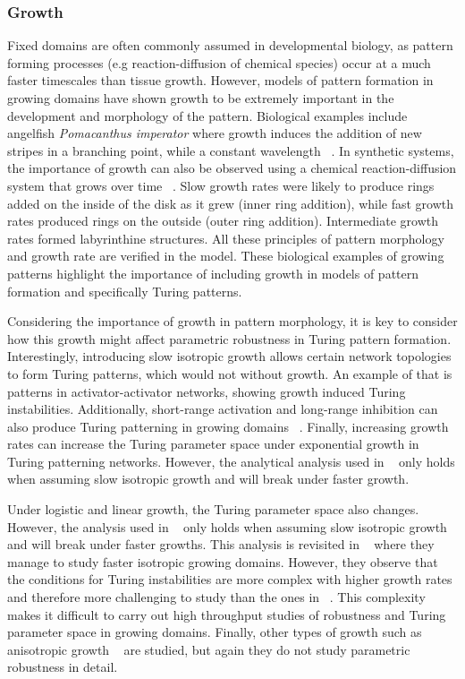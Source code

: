  \subsubsection{Growth}
Fixed domains are often commonly assumed in developmental biology, as pattern forming processes (e.g reaction-diffusion of chemical species) occur at a much faster timescales than tissue growth. %
However, models of pattern formation in growing domains have shown growth to be extremely important in the development and morphology of the pattern.
Biological examples include angelﬁsh \textit{Pomacanthus imperator} where growth induces the addition of new stripes in a branching point, while a constant wavelength ~\parencite{Kondo1995}.
In synthetic systems, the importance of growth can also be observed using a chemical reaction-diffusion system that grows over time ~\parencite{Konow2019}.
Slow growth rates were likely to produce rings added on the inside of the disk as it grew (inner ring addition), while fast growth rates produced rings on the outside (outer ring addition).
Intermediate growth rates formed labyrinthine structures.
All these principles of pattern morphology and growth rate are verified in the model.
These biological examples of growing patterns highlight the importance of including growth in models of pattern formation and specifically Turing patterns.

Considering the importance of growth in pattern morphology, it is key to consider how this growth might affect parametric robustness in Turing pattern formation.
Interestingly, introducing slow isotropic growth allows certain network topologies to form Turing patterns, which would not without growth.
An example of that is patterns in activator-activator networks, showing growth induced Turing instabilities.
Additionally, short-range activation and long-range inhibition can also produce Turing patterning in growing domains ~\cite{gaffney2010}.
Finally, increasing growth rates can increase the Turing parameter space under exponential growth in Turing patterning networks.
However, the analytical analysis used in ~\cite{gaffney2010} only holds when assuming slow isotropic growth and will break under faster growth.

Under logistic and linear growth, the Turing parameter space also changes.
However, the analysis used in ~\cite{gaffney2010} only holds when assuming slow isotropic growth and will break under faster growths.
This analysis is revisited in ~\cite{Klika2017} where they manage to study faster isotropic growing domains.
However, they observe that the conditions for Turing instabilities are more complex with higher growth rates and therefore more challenging to study than the ones in ~\cite{gaffney2010}.
This complexity makes it difficult to carry out high throughput studies of robustness and Turing parameter space in growing domains.
Finally, other types of growth such as anisotropic growth ~\parencite{Krause2019} are studied, but again they do not study parametric robustness in detail.

